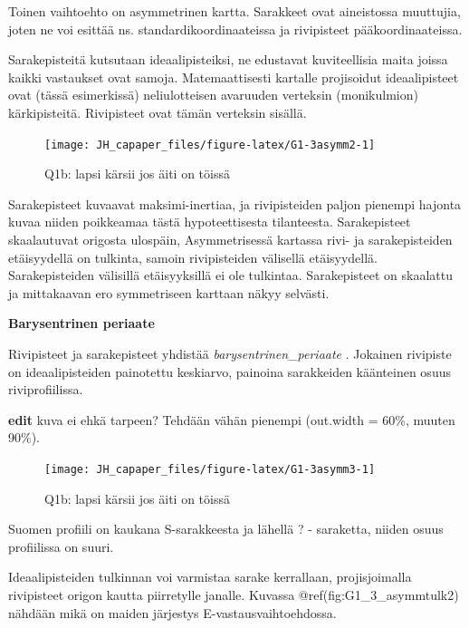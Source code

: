 \documentclass[
  finnish,
]{book}
\begin{document}
Toinen vaihtoehto on asymmetrinen kartta. Sarakkeet ovat aineistossa muuttujia,
joten ne voi esittää ns. standardikoordinaateissa ja rivipisteet pääkoordinaateissa.

Sarakepisteitä kutsutaan ideaalipisteiksi, ne edustavat kuviteellisia maita joissa
kaikki vastaukset ovat samoja. Matemaattisesti kartalle projisoidut ideaalipisteet
ovat (tässä esimerkissä) neliulotteisen avaruuden verteksin (monikulmion)
kärkipisteitä. Rivipisteet ovat tämän verteksin sisällä.

\begin{figure}

{\centering \texttt{[image: JH\_capaper\_files/figure-latex/G1-3asymm2-1]} 

}

\caption{Q1b: lapsi kärsii jos äiti on töissä}\label{fig:G1-3asymm2}
\end{figure}

Sarakepisteet kuvaavat maksimi-inertiaa, ja rivipisteiden paljon pienempi hajonta
kuvaa niiden poikkeamaa tästä hypoteettisesta tilanteesta. Sarakepisteet
skaalautuvat origosta ulospäin, Asymmetrisessä kartassa rivi- ja sarakepisteiden
etäisyydellä on tulkinta, samoin rivipisteiden välisellä etäisyydellä.
Sarakepisteiden välisillä etäisyyksillä ei ole tulkintaa. Sarakepisteet on
skaalattu ja mittakaavan ero symmetriseen karttaan näkyy selvästi.

\textbf{Barysentrinen periaate}

Rivipisteet ja sarakepisteet yhdistää \emph{barysentrinen\_periaate} . Jokainen rivipiste
on ideaalipisteiden painotettu keskiarvo, painoina sarakkeiden käänteinen osuus
riviprofiilissa.

\textbf{edit} kuva ei ehkä tarpeen? Tehdään vähän pienempi (out.width = 60\%, muuten 90\%).

\begin{figure}

{\centering \texttt{[image: JH\_capaper\_files/figure-latex/G1-3asymm3-1]} 

}

\caption{Q1b: lapsi kärsii jos äiti on töissä}\label{fig:G1-3asymm3}
\end{figure}

Suomen profiili on kaukana S-sarakkeesta ja lähellä ? - saraketta, niiden osuus
profiilissa on suuri.

Ideaalipisteiden tulkinnan voi varmistaa sarake kerrallaan, projisjoimalla rivipisteet
origon kautta piirretylle janalle. Kuvassa @ref(fig:G1\_3\_asymmtulk2) nähdään mikä
on maiden järjestys E-vastausvaihtoehdossa.
\end{document}
